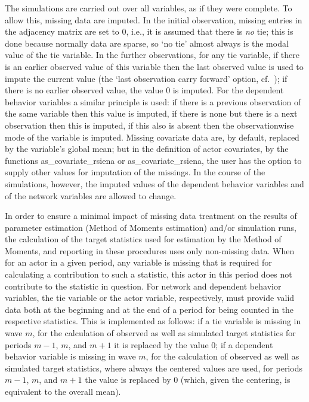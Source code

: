 \documentclass[a4paper,fleqn,11pt]{article}
\newcommand{\+}{\, + \,}
\newcommand{\sfn}[1]{\textsf{#1}}
\begin{document}
The simulations are carried out over all variables,
as if they were complete.
To allow this, missing data are imputed.
In the initial observation, missing entries in the adjacency
matrix are set to 0,
i.e., it is assumed that there is \emph{no} tie;
this is done because normally data are sparse, so `no tie'
almost always is the modal value of the tie variable.
In the further observations, for any tie variable,
if there is an earlier observed value of this variable then
the last observed value is used to impute the current
value (the `last observation carry forward' option,
cf.\ \citet{Lepkowski89}); if there is no earlier observed
value, the value 0 is imputed.
For the dependent behavior variables a similar principle
is used: if there is a previous observation of the same variable
then this value is imputed, if there is none but there
is a next observation then this is imputed, if this also is absent
then the observationwise mode of the variable is imputed.
Missing covariate data are, by default, replaced by the
variable's global mean; but in the definition of actor covariates,
by the functions \sfn{as\_covariate\_rsiena} or \sfn{as\_covariate\_rsiena}, the user
has the option to supply other values for imputation of the missings.
In the course of the simulations, however, the imputed values of the dependent
behavior variables and of the network variables are allowed to change.
\medskip

In order to ensure a minimal impact of missing data treatment on
the results of parameter estimation (Method of Moments estimation)
and/or simulation runs, the calculation of the target statistics
used for estimation by the Method of Moments, and reporting in these
procedures uses only non-missing data.
When for an actor in a given period, any variable is missing that is
required for calculating a contribution to such a statistic, this
actor in this period does not contribute to the statistic in
question. For network and dependent behavior variables, the tie variable
or the actor variable, respectively,
must provide valid data both at the beginning and at the end of a
period for being counted in the respective statistics.
This is implemented as follows: if a tie variable is missing in wave $m$,
for the calculation of observed as well as simulated target statistics
for periods $m-1$, $m$, and $m+1$ it is replaced by the value 0;
if a dependent behavior variable is missing in wave $m$,
for the calculation of observed as well as simulated target statistics,
where always the centered values are used, for periods $m-1$, $m$, and $m+1$
the value is replaced by 0 (which, given the centering,
is equivalent to the overall mean).
\end{document}
